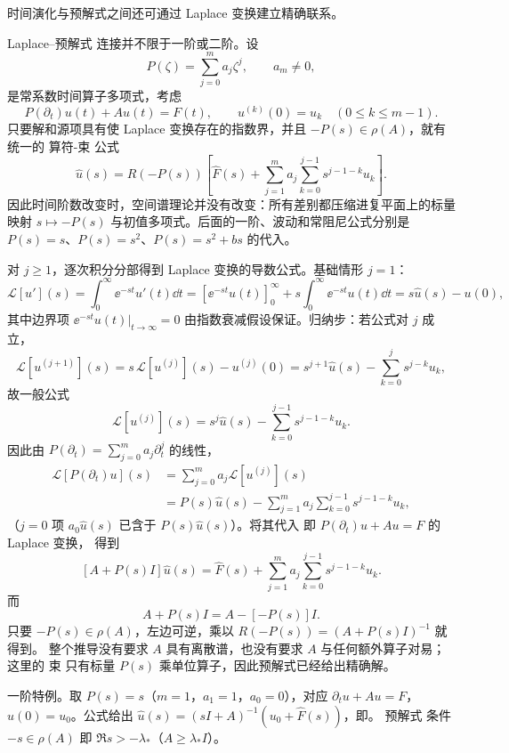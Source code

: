 时间演化与预解式之间还可通过 Laplace 变换建立精确联系。

Laplace--预解式 连接并不限于一阶或二阶。设
\[
 P(\zeta)=\sum_{j=0}^m a_j\zeta^j,
 \qquad a_m\ne0,
\]
是常系数时间算子多项式，考虑
\begin{equation}\label{eq:math-sl-operator-pencil-time}
 P(\partial_t)u(t)+Au(t)=F(t),
 \qquad u^{(k)}(0)=u_k\quad(0\le k\le m-1).
\end{equation}
只要解和源项具有使 Laplace 变换存在的指数界，并且
$-P(s)\in\rho(A)$，就有统一的 算符-束 公式
\begin{equation}\label{eq:math-sl-operator-pencil-resolvent}
 \widehat u(s)
 =R(-P(s))
 \left[
 \widehat F(s)
 +\sum_{j=1}^m a_j\sum_{k=0}^{j-1}
 s^{j-1-k}u_k
 \right].
\end{equation}
因此时间阶数改变时，空间谱理论并没有改变：所有差别都压缩进复平面上的标量映射 $s\mapsto-P(s)$ 与初值多项式。后面的一阶、波动和常阻尼公式分别是 $P(s)=s$、$P(s)=s^2$、$P(s)=s^2+bs$ 的代入。

对 $j\ge1$，逐次积分分部得到 Laplace 变换的导数公式。基础情形 $j=1$：
\[
 \mathcal L[u'](s)=\int_0^\infty\ee^{-st}u'(t)\dd t
 =[\ee^{-st}u(t)]_0^\infty+s\int_0^\infty\ee^{-st}u(t)\dd t
 =s\widehat u(s)-u(0),
\]
其中边界项 $\ee^{-st}u(t)|_{t\to\infty}=0$ 由指数衰减假设保证。归纳步：若公式对 $j$ 成立，
\[
 \mathcal L[u^{(j+1)}](s)=s\,\mathcal L[u^{(j)}](s)-u^{(j)}(0)
 =s^{j+1}\widehat u(s)-\sum_{k=0}^{j}s^{j-k}u_k,
\]
故一般公式
\[
 \mathcal L[u^{(j)}](s)
 =s^j\widehat u(s)
 -\sum_{k=0}^{j-1}s^{j-1-k}u_k.
\]
因此由 $P(\partial_t)=\sum_{j=0}^ma_j\partial_t^j$ 的线性，
\[
 \begin{aligned}
 \mathcal L[P(\partial_t)u](s)
 &=\sum_{j=0}^ma_j\mathcal L[u^{(j)}](s)\\
 &=P(s)\widehat u(s)
 -\sum_{j=1}^m a_j\sum_{k=0}^{j-1}s^{j-1-k}u_k,
 \end{aligned}
\]
（$j=0$ 项 $a_0\widehat u(s)$ 已含于 $P(s)\widehat u(s)$）。将其代入
 即 $P(\partial_t)u+Au=F$ 的 Laplace 变换，
得到
\[
 [A+P(s)I]\widehat u(s)
 =\widehat F(s)
 +\sum_{j=1}^m a_j\sum_{k=0}^{j-1}s^{j-1-k}u_k.
\]
而
\[
 A+P(s)I=A-[-P(s)]I.
\]
只要 $-P(s)\in\rho(A)$，左边可逆，乘以
$R(-P(s))=(A+P(s)I)^{-1}$ 就得到。
整个推导没有要求 $A$ 具有离散谱，也没有要求 $A$ 与任何额外算子对易；这里的 束
只有标量 $P(s)$ 乘单位算子，因此预解式已经给出精确解。

一阶特例。取 $P(s)=s$（$m=1$，$a_1=1$，$a_0=0$），对应
$\partial_tu+Au=F$，$u(0)=u_0$。公式给出
$\widehat u(s)=(sI+A)^{-1}(u_0+\widehat F(s))$，即。
预解式 条件 $-s\in\rho(A)$ 即 $\Re s>-\lambda_*$（$A\ge\lambda_*I$）。


